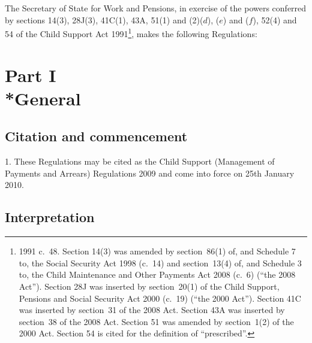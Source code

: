 \documentclass[12pt,a4paper]{article}
\title{\regstitle}
\author{S.I.\ 2009 No.\ 3151}
\date{Made
30th November 2009\\
Laid before Parliament
4th Deceember 2009\\
Coming into~force
25th January 2010
}
\begin{document}
\maketitle

\noindent
The Secretary of State for Work and Pensions, in exercise of the powers conferred by sections 14(3), 28J(3), 41C(1), 43A, 51(1) and (2)($d$), ($e$)  and ($f$), 52(4) and 54 of the Child Support Act 1991\footnote{1991 c.~48. Section 14(3) was amended by section~86(1) of, and Schedule 7 to, the Social Security Act 1998 (c.~14) and section~13(4) of, and Schedule 3 to, the Child Maintenance and Other Payments Act 2008 (c.~6) (“the 2008 Act”). Section 28J was inserted by section~20(1) of the Child Support, Pensions and Social Security Act 2000 (c.~19) (“the 2000 Act”). Section 41C was inserted by section~31 of the 2008 Act. Section 43A was inserted by section~38 of the 2008 Act. Section 51 was amended by section~1(2) of the 2000 Act. Section 54 is cited for the definition of “prescribed”.}, makes the following Regulations: 

{\sloppy

\tableofcontents

}

\bigskip

\setcounter{secnumdepth}{-2}

\vfill

\section[Part I --- General]{Part I\\*General}

\renewcommand\parthead{--- Part I}

\subsection[1. Citation and commencement]{Citation and commencement}

1.  These Regulations may be cited as the Child Support (Management of Payments and Arrears) Regulations 2009 and come into force on 25th January 2010.

\subsection[2. Interpretation]{Interpretation}
\end{document}
